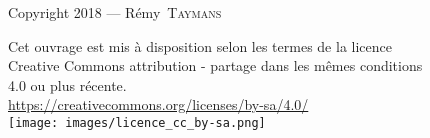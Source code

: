 Copyright 2018 --- Rémy~\textsc{Taymans}

Cet ouvrage est mis à disposition selon les termes de la licence\\
Creative Commons attribution - partage dans les mêmes conditions\\
4.0 ou plus récente.\\
\url{https://creativecommons.org/licenses/by-sa/4.0/}\\
\vspace{\baselineskip}
\texttt{[image: images/licence\_cc\_by-sa.png]}


